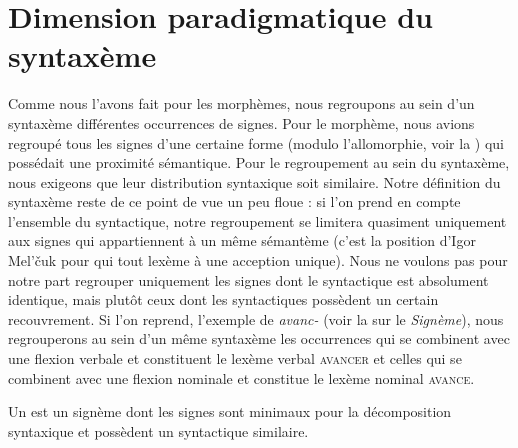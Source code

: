 \section{Dimension paradigmatique du syntaxème}\label{sec:3.1.9}

Comme nous l’avons fait pour les morphèmes, nous regroupons au sein d’un syntaxème différentes occurrences de signes. Pour le morphème, nous avions regroupé tous les signes d’une certaine forme (modulo l’allomorphie, voir la ) qui possédait une proximité sémantique. Pour le regroupement au sein du syntaxème, nous exigeons que leur distribution syntaxique soit similaire. Notre définition du syntaxème reste de ce point de vue un peu floue : si l’on prend en compte l’ensemble du syntactique, notre regroupement se limitera quasiment uniquement aux signes qui appartiennent à un même sémantème (c’est la position d’Igor Mel’čuk pour qui tout lexème à une acception unique). Nous ne voulons pas pour notre part regrouper uniquement les signes dont le syntactique est absolument identique, mais plutôt ceux dont les syntactiques possèdent un certain recouvrement. Si l’on reprend, l’exemple de \textit{avanc-} (voir la  sur le \textit{Signème}), nous regrouperons au sein d’un même syntaxème les occurrences qui se combinent avec une flexion verbale et constituent le lexème verbal \textsc{avancer} et celles qui se combinent avec une flexion nominale et constitue le lexème nominal \textsc{avance}.

{Un  est un signème dont les signes sont minimaux pour la décomposition syntaxique et possèdent un syntactique similaire.}


